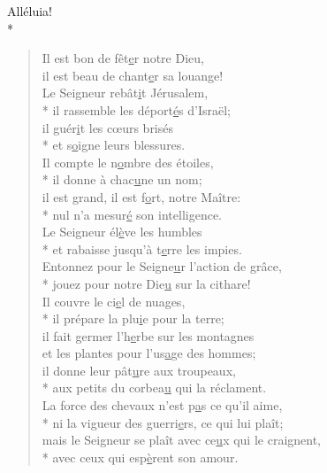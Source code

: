 Alléluia! \\*

\begin{verse}
Il est bon de fêt\underline{e}r notre Dieu, \\
il est beau de chant\underline{e}r sa louange! \\

Le Seigneur rebât\underline{i}t Jérusalem, \\*
il rassemble les déport\underline{é}s d’Israël; \\
il guér\underline{i}t les cœurs brisés \\*
et s\underline{o}igne leurs blessures. \\

Il compte le n\underline{o}mbre des étoiles, \\*
il donne à chac\underline{u}ne un nom; \\
il est grand, il est f\underline{o}rt, notre Maître: \\*
nul n’a mesur\underline{é} son intelligence. \\
Le Seigneur él\underline{è}ve les humbles \\*
et rabaisse jusqu’à t\underline{e}rre les impies. \\

Entonnez pour le Seigne\underline{u}r l’action de grâce, \\*
jouez pour notre Die\underline{u} sur la cithare! \\

Il couvre le ci\underline{e}l de nuages, \\*
il prépare la plu\underline{i}e pour la terre; \\
il fait germer l’h\underline{e}rbe sur les montagnes \\
et les plantes pour l’us\underline{a}ge des hommes; \\
il donne leur pât\underline{u}re aux troupeaux, \\*
aux petits du corbea\underline{u} qui la réclament. \\

La force des chevaux n’est p\underline{a}s ce qu’il aime, \\*
ni la vigueur des guerri\underline{e}rs, ce qui lui plaît; \\
mais le Seigneur se plaît avec ce\underline{u}x qui le craignent, \\*
avec ceux qui esp\underline{è}rent son amour. \\
\end{verse}

